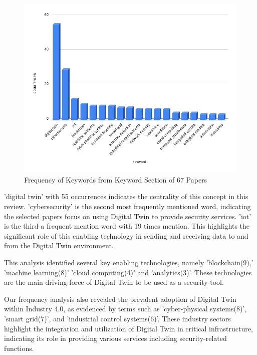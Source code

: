 \begin{figure}[H]
    \includegraphics[width=1\linewidth]{images/rt/keywordoccurence.png}
    \caption{Frequency of Keywords from Keyword Section of 67 Papers}
    \label{fig:alluvial-key}
\end{figure}


'digital twin' with 55 occurrences indicates the centrality of this concept in this review. 'cybersecurity' is the second most frequently mentioned word, indicating the selected papers focus on using Digital Twin to provide security services. 'iot' is the third a frequent mention word with 19 times mention.   This highlights the significant role of this enabling technology in sending and receiving data to and from the Digital Twin environment. 

This analysis identified several key enabling technologies, namely 'blockchain(9),' 'machine learning(8)' 'cloud computing(4)' and 'analytics(3)'. These technologies are the main driving force of Digital Twin to be used as a security tool. 

Our frequency analysis also revealed the prevalent adoption of Digital Twin within Industry 4.0, as evidenced by terms such as 'cyber-physical systems(8)', 'smart grid(7)', and 'industrial control systems(6)'. These industry sectors highlight the integration and utilization of Digital Twin in critical infrastructure, indicating its role in providing various services including security-related functions. 


